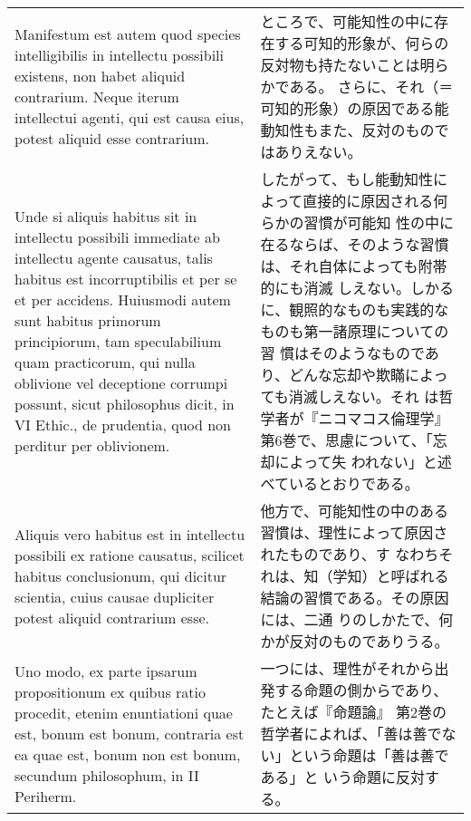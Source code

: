 \documentclass[10pt]{jsarticle} %
\begin{document}
\begin{longtable}{p{21em}p{21em}}
\\


Manifestum est
autem quod species intelligibilis in intellectu possibili existens,
non habet aliquid contrarium. Neque iterum intellectui agenti, qui est
causa eius, potest aliquid esse contrarium. 


&

ところで、可能知性の中に存在する可知的形象が、何らの反対物も持たないことは明らかである。
さらに、それ（＝可知的形象）の原因である能動知性もまた、反対のものではありえない。

\\


Unde si aliquis habitus
sit in intellectu possibili immediate ab intellectu agente causatus,
talis habitus est incorruptibilis et per se et per accidens. Huiusmodi
autem sunt habitus primorum principiorum, tam speculabilium quam
practicorum, qui nulla oblivione vel deceptione corrumpi possunt,
sicut philosophus dicit, in VI Ethic., de prudentia, quod non perditur
per oblivionem. 


&

したがって、もし能動知性によって直接的に原因される何らかの習慣が可能知
性の中に在るならば、そのような習慣は、それ自体によっても附帯的にも消滅
しえない。しかるに、観照的なものも実践的なものも第一諸原理についての習
慣はそのようなものであり、どんな忘却や欺瞞によっても消滅しえない。それ
は哲学者が『ニコマコス倫理学』第6巻で、思慮について、「忘却によって失
われない」と述べているとおりである。

\\


Aliquis vero habitus est in intellectu possibili ex
ratione causatus, scilicet habitus conclusionum, qui dicitur scientia,
cuius causae dupliciter potest aliquid contrarium esse. 


&

他方で、可能知性の中のある習慣は、理性によって原因されたものであり、す
なわちそれは、知（学知）と呼ばれる結論の習慣である。その原因には、二通
りのしかたで、何かが反対のものでありうる。

\\


Uno modo, ex
parte ipsarum propositionum ex quibus ratio procedit, etenim
enuntiationi quae est, bonum est bonum, contraria est ea quae est,
bonum non est bonum, secundum philosophum, in II Periherm. 


&

一つには、理性がそれから出発する命題の側からであり、たとえば『命題論』
第2巻の哲学者によれば、「善は善でない」という命題は「善は善である」と
いう命題に反対する。



\end{longtable}
\end{document}
